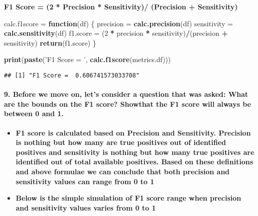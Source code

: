 \documentclass[]{article}
\newenvironment{Shaded}{\begin{snugshade}}{\end{snugshade}}
\newcommand{\ControlFlowTok}[1]{\textcolor[rgb]{0.13,0.29,0.53}{\textbf{#1}}}
\newcommand{\DecValTok}[1]{\textcolor[rgb]{0.00,0.00,0.81}{#1}}
\newcommand{\KeywordTok}[1]{\textcolor[rgb]{0.13,0.29,0.53}{\textbf{#1}}}
\newcommand{\NormalTok}[1]{#1}
\newcommand{\OperatorTok}[1]{\textcolor[rgb]{0.81,0.36,0.00}{\textbf{#1}}}
\newcommand{\StringTok}[1]{\textcolor[rgb]{0.31,0.60,0.02}{#1}}
\let\oldparagraph\paragraph
\renewcommand{\paragraph}[1]{\oldparagraph{#1}\mbox{}}
\begin{document}
\textbf{F1 Score = (2 * Precision * Sensitivity)/ (Precision +
Sensitivity)}

\begin{Shaded}
\begin{Highlighting}[]
\NormalTok{calc.f1score =}\StringTok{ }\ControlFlowTok{function}\NormalTok{(df)}
\NormalTok{\{}
\NormalTok{  precision =}\StringTok{ }\KeywordTok{calc.precision}\NormalTok{(df)}
\NormalTok{  sensitivity =}\StringTok{ }\KeywordTok{calc.sensitivity}\NormalTok{(df)}
\NormalTok{  f1.score =}\StringTok{ }\NormalTok{(}\DecValTok{2} \OperatorTok{*}\StringTok{ }\NormalTok{precision }\OperatorTok{*}\StringTok{ }\NormalTok{sensitivity)}\OperatorTok{/}\NormalTok{(precision }\OperatorTok{+}\StringTok{ }\NormalTok{sensitivity)}
  \KeywordTok{return}\NormalTok{(f1.score)}
\NormalTok{\}}

\KeywordTok{print}\NormalTok{(}\KeywordTok{paste}\NormalTok{(}\StringTok{'F1 Score = '}\NormalTok{, }\KeywordTok{calc.f1score}\NormalTok{(metrics.df)))}
\end{Highlighting}
\end{Shaded}

\begin{verbatim}
## [1] "F1 Score =  0.606741573033708"
\end{verbatim}

\hypertarget{before-we-move-on-lets-consider-a-question-that-was-asked-what-are-the-bounds-on-the-f1-score-showthat-the-f1-score-will-always-be-between-0-and-1.}{%
\paragraph{9. Before we move on, let's consider a question that was
asked: What are the bounds on the F1 score? Showthat the F1 score will
always be between 0 and
1.}\label{before-we-move-on-lets-consider-a-question-that-was-asked-what-are-the-bounds-on-the-f1-score-showthat-the-f1-score-will-always-be-between-0-and-1.}}

\begin{itemize}
\item
  \textbf{F1 score is calculated based on Precision and Sensitivity.
  Precision is nothing but how many are true positives out of identified
  positives and sensitivity is nothing but how many true positives are
  identified out of total available positives. Based on these
  definitions and above formulae we can conclude that both precision and
  sensitivity values can range from 0 to 1}
\item
  \textbf{Below is the simple simulation of F1 score range when
  precision and sensitivity values varies from 0 to 1}
\end{itemize}
\end{document}
